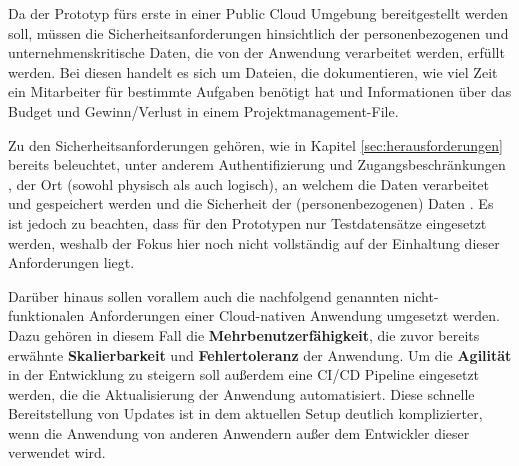 Da der Prototyp fürs erste in einer Public Cloud Umgebung bereitgestellt werden soll, müssen die Sicherheitsanforderungen hinsichtlich der personenbezogenen und unternehmenskritische Daten, die von der Anwendung verarbeitet werden, erfüllt werden. Bei diesen handelt es sich um Dateien, die dokumentieren, wie viel Zeit ein Mitarbeiter für bestimmte Aufgaben benötigt hat und Informationen über das Budget und Gewinn/Verlust in einem Projektmanagement-File.

Zu den Sicherheitsanforderungen gehören, wie in Kapitel \ref{sec:herausforderungen} bereits beleuchtet, unter anderem Authentifizierung und Zugangsbeschränkungen \cite[Vgl.][S. 695]{Kumar2018}, der Ort (sowohl physisch als auch logisch), an welchem die Daten verarbeitet und gespeichert werden \cite[Vgl.][S. 696]{Kumar2018} und die Sicherheit der (personenbezogenen) Daten \cite[Vgl.][S. 696]{Kumar2018}. Es ist jedoch zu beachten, dass für den Prototypen nur Testdatensätze eingesetzt werden, weshalb der Fokus hier noch nicht vollständig auf der Einhaltung dieser Anforderungen liegt.


Darüber hinaus sollen vorallem auch die nachfolgend genannten nicht-funktionalen Anforderungen einer Cloud-nativen Anwendung umgesetzt werden. Dazu gehören in diesem Fall die \textbf{Mehrbenutzerfähigkeit}, die zuvor bereits erwähnte \textbf{Skalierbarkeit} und \textbf{Fehlertoleranz} der Anwendung. Um die \textbf{Agilität} in der Entwicklung zu steigern soll außerdem eine CI/CD Pipeline eingesetzt werden, die die Aktualisierung der Anwendung automatisiert. Diese schnelle Bereitstellung von Updates ist in dem aktuellen Setup deutlich komplizierter, wenn die Anwendung von anderen Anwendern außer dem Entwickler dieser verwendet wird.

\pagebreak